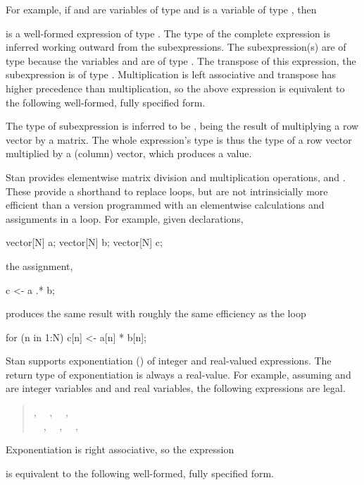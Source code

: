 For example, if  and  are variables of type
 and  is a variable of type ,
then
%
\begin{quote}
\end{quote}
%
is a well-formed expression of type .  The type of the
complete expression is inferred working outward from the
subexpressions.  The subexpression(s)  are of type
 because the variables  and  are of type
.  The transpose of this expression, the subexpression
 is of type .  Multiplication is
left associative and transpose has higher precedence than
multiplication, so the above expression is equivalent to the following
well-formed, fully specified form.
%
\begin{quote}
\end{quote}
%
The type of subexpression  is inferred to be
, being the result of multiplying a row vector by a
matrix.  The whole expression's type is thus the type of a row vector
multiplied by a (column) vector, which produces a  value.

Stan provides elementwise matrix division and multiplication
operations,  and .  These provide a shorthand
to replace loops, but are not intrinsicially more efficient than a
version programmed with an elementwise calculations and assignments in
a loop.  For example, given declarations,
%
\begin{stancode}
vector[N] a;
vector[N] b;
vector[N] c;
\end{stancode}
%
the assignment,
%
\begin{stancode}
c <- a .* b;
\end{stancode}
%
produces the same result with roughly the same efficiency as the loop
%
\begin{stancode}
for (n in 1:N)
  c[n] <- a[n] * b[n];
\end{stancode}

Stan supports exponentiation (\code{\textasciicircum}) of integer and
real-valued expressions.  The return type of exponentiation is always
a real-value.  For example, assuming  and  are integer
variables and  and  real variables, the following
expressions are legal.
%
\begin{quote}
,
\ \ ,
\ \ ,
\\
\ \ ,
\ \ ,
\ \ ,
\ \ 
\end{quote}
%
Exponentiation is right associative, so the expression
%
\begin{quote}
\end{quote}
%
is equivalent to the following well-formed, fully specified form.
%
\begin{quote}
\end{quote}
%



